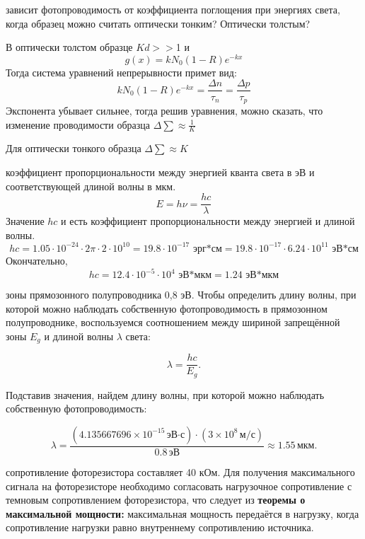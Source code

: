 \documentclass[a4paper, 12pt]{article}
\begin{document}
\begin{enumerate}
 зависит фотопроводимость от коэффициента поглощения при энергиях света, когда образец можно считать оптически тонким? Оптически толстым?\par
В оптически толстом образце $Kd>>$1 и
\begin{equation}
    g(x) = kN_0(1-R)e^{-kx}
\end{equation}
Тогда система уравнений непрерывности примет вид:
\begin{equation}
    kN_0(1-R)e^{-kx}=\frac{\Delta n}{\tau_n}=\frac{\Delta p}{\tau_p}
\end{equation}
Экспонента убывает сильнее, тогда решив уравнения, можно сказать, что изменение проводимости образца $\Delta \sum \approx \frac{1}{K}$\par
Для оптически тонкого образца $\Delta \sum \approx K$\par
{} коэффициент пропорциональности между энергией кванта света в эВ и соответствующей длиной волны в мкм.
\begin{equation}
    E = h\nu = \frac{hc}{\lambda}
\end{equation}
Значение $hc$ и есть коэффициент пропорциональности между энергией и длиной волны.
\begin{equation}
    hc = 1.05 \cdot 10^{-24}\cdot 2\pi \cdot 2\cdot 10^{10}= 19.8 \cdot 10^{-17} \text{ эрг*см} = 19.8\cdot 10^{-17} \cdot 6.24\cdot 10^{11}\text{ эВ*см}
\end{equation}
Окончательно,
\begin{equation}
    hc =12.4 \cdot 10^{-5} \cdot 10^{4} \text{ эВ*мкм}=1.24 \text{ эВ*мкм}
\end{equation}

 зоны прямозонного полупроводника 0,8 эВ. Чтобы определить длину волны, при которой можно наблюдать собственную фотопроводимость в прямозонном полупроводнике, воспользуемся соотношением между шириной запрещённой зоны \(E_g\) и длиной волны \(\lambda\) света:

\[\lambda = \frac{hc}{E_g}.\]

Подставив значения, найдем длину волны, при которой можно наблюдать собственную фотопроводимость:

\[\lambda = \frac{(4.135667696 \times 10^{-15} \, \text{эВ·с}) \cdot (3 \times 10^8 \, \text{м/с})}{0.8 \, \text{эВ}} \approx 1.55 \, \text{мкм} .\]

 сопротивление фоторезистора составляет 40 кОм. Для получения максимального сигнала на фоторезисторе необходимо согласовать нагрузочное сопротивление с темновым сопротивлением фоторезистора, что следует из \textbf{теоремы о максимальной мощности: }максимальная мощность передаётся в нагрузку, когда сопротивление нагрузки равно внутреннему сопротивлению источника.


\end{enumerate}
\end{document}
